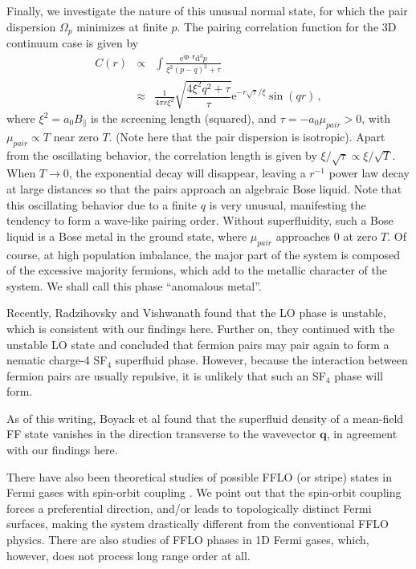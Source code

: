 \documentclass[aps,twocolumn,prl,tightenlines,floatfix]{revtex4-1}
\begin{document}
Finally, we investigate the nature of this unusual normal state, for
which the pair dispersion $\Omega_{p}$ minimizes at finite
$p$. The pairing correlation function for the 3D continuum case is
given by
%
\begin{eqnarray}
C(r) &\propto& \int \frac{\mbox{e}^{i\mathbf{p}\cdot
    \mathbf{r}}\mathrm{d}^3p}{\xi^2(p-q)^2+\tau }\nonumber\\&\approx&
\frac{1}{4\pi r\xi^2}\sqrt{\dfrac{4\xi^2q^2+\tau}{\tau}}\mbox{e}^{-r\sqrt{\tau}/\xi}
\sin(qr)\,,
\end{eqnarray}
%
where $\xi^2=a_0B_\parallel$ is the screening length (squared), and
$\tau = -a_0\mu_{pair} > 0$, with $\mu_{pair}\propto T$ near zero $T$. (Note
here that the pair dispersion is isotropic). Apart
from the oscillating behavior, the correlation length is given by
$\xi/\sqrt{\tau}\propto \xi/\sqrt{T}$. When $T\rightarrow 0$, the
exponential decay will disappear, leaving a $r^{-1}$ power law decay
at large distances so that the pairs approach an algebraic Bose
liquid. Note that this oscillating behavior due to a finite $q$ is
very unusual, manifesting the tendency to form a wave-like pairing
order. Without superfluidity, such a Bose liquid is a Bose metal in
the ground state, where $\mu_{pair}$ approaches 0 at zero $T$. Of course,
at high population imbalance, the major part of the system is composed
of the excessive majority fermions, which add to the metallic character
of the system. We shall call this phase ``anomalous metal''.


Recently, Radzihovsky and Vishwanath\cite{Ashvin} found that the LO
phase is unstable, which is consistent with our findings here. Further
on, they continued with the unstable LO state and concluded that
fermion pairs may pair again to form a nematic charge-4 SF$_4$
superfluid phase. However, because the interaction between fermion
pairs are usually repulsive, it is unlikely that such an SF$_4$ phase
will form. 

As of this writing, Boyack et al \cite{Rufus} found that the
superfluid density of a mean-field FF state vanishes in the direction
transverse to the wavevector $\mathbf{q}$, in agreement with our
findings here.

There have also been theoretical studies of possible FFLO (or stripe)
states in Fermi gases with spin-orbit coupling
\cite{chuanwei12,*xiaji13,Pu2013,*Iskin2013,*Yi2013PRL}. We point out
that the spin-orbit coupling forces a preferential direction, and/or
leads to topologically distinct Fermi surfaces, making the system
drastically different from the conventional FFLO physics. There are
also studies of FFLO phases in 1D Fermi gases, which, however, does
not process long range order at all.
\end{document}
